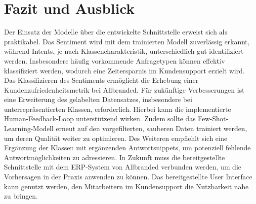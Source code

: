 \chapter{Fazit und Ausblick}

Der Einsatz der Modelle über die entwickelte Schnittstelle erweist sich als praktikabel. Das Sentiment wird mit dem trainierten Modell zuverlässig erkannt, während Intents, je nach Klassencharakteristik, unterschiedlich gut identifiziert werden. Insbesondere häufig vorkommende Anfragetypen können effektiv klassifiziert werden, wodurch eine Zeitersparnis im Kundensupport erzielt wird. Das Klassifizieren des Sentiments ermöglicht die Erhebung einer Kundenzufriedenheitsmetrik bei Allbranded.
Für zukünftige Verbesserungen ist eine Erweiterung des gelabelten Datensatzes, insbesondere bei unterrepräsentierten Klassen, erforderlich. Hierbei kann die implementierte Human-Feedback-Loop unterstützend wirken. Zudem sollte das Few-Shot-Learning-Modell erneut auf den vorgefilterten, sauberen Daten trainiert werden, um deren Qualität weiter zu optimieren. Des Weiteren empfiehlt sich eine Ergänzung der Klassen mit ergänzenden Antwortsnippets, um potenziell fehlende Antwortmöglichkeiten zu adressieren. In Zukunft muss die bereitgestellte Schnittstelle mit dem ERP-System von Allbranded verbunden werden, um die Vorhersagen in der Praxis anwenden zu können. Das bereitgestellte User Interface kann genutzt werden, den Mitarbeitern im Kundensupport die Nutzbarkeit nahe zu bringen. 